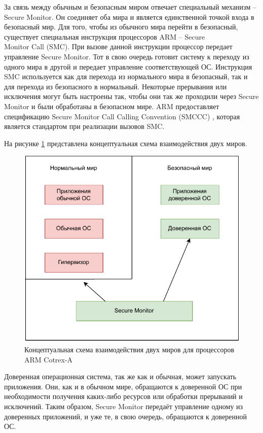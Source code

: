 За связь между обычным и безопасным миром отвечает специальный механизм -- Secure Monitor. Он соединяет оба мира и является единственной точкой входа в безопасный мир. Для того, чтобы из обычного мира перейти в безопасный, существует специальная инструкция процессоров ARM -- Secure\\Monitor Call (SMC). При вызове данной инструкции процессор передает управление Secure Monitor. Тот в свою очередь готовит систему к переходу из одного мира в другой и передает управление соответствующей ОС. Инструкция SMC используется как для перехода из нормального мира в безопасный, так и для перехода из безопасного в нормальный. Некоторые прерывания или исключения могут быть настроены так, чтобы они так же проходили через Secure Monitor и были обработаны в безопасном мире. ARM предоставляет спецификацию Secure Monitor Call Calling Convention (SMCCC) \cite{smccc}, которая является стандартом при реализации вызовов SMC. 

На рисунке \ref{fig:trustzone-conceptual} представлена концептуальная схема взаимодействия двух миров.

\begin{figure}[h]
	\centering
	\includegraphics[width=\textwidth]{img/arm-conceptual.pdf}
	\caption{Концептуальная схема взаимодействия двух миров для процессоров ARM Cotrex-A}
	\label{fig:trustzone-conceptual}
\end{figure}

Доверенная операционная система, так же как и обычная, может запускать приложения. Они, как и в обычном мире, обращаются к доверенной ОС при необходимости получения каких-либо ресурсов или обработки прерываний и исключений. Таким образом, Secure Monitor передаёт управление одному из доверенных приложений, и уже те, в свою очередь, обращаются к доверенной ОС.

